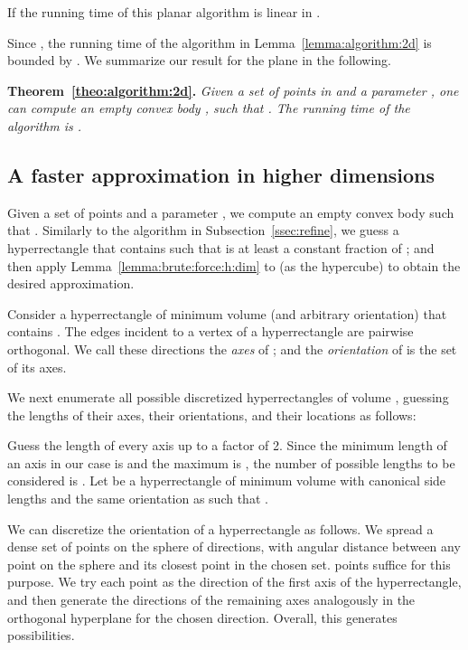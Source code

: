 \documentclass[11pt]{article}
\newcommand{\lemref}[1]{Lemma~\ref{lemma:#1}}
\newcommand{\thmref}[1]{Theorem~\ref{theo:#1}}
\begin{document}
If  the running time of this planar algorithm is linear in .

\medskip
Since , the running time of the algorithm in \lemref{algorithm:2d}
is bounded by .
We summarize our result for the plane in the following.

\medskip
\noindent
{\bf \thmref{algorithm:2d}.} {\em
    Given a set  of  points in  and a
    parameter , one can compute an empty convex body
    , such that . The running time of the algorithm is
    .
}

\subsection{A faster approximation in higher dimensions}
\label{ssec:refine:d}

Given a set  of  points
and a parameter , we compute an empty
convex body  such that
.
Similarly to the algorithm in Subsection~\ref{ssec:refine},
we guess a hyperrectangle  that contains 
such that  is at least a constant fraction
of ; and then apply \lemref{brute:force:h:dim} to 
(as the hypercube) to obtain the desired approximation.

Consider a hyperrectangle  of minimum volume (and arbitrary
orientation) that contains . The  edges incident to a vertex of a
hyperrectangle  are pairwise orthogonal. We call these  directions the
\emph{axes} of ; and the \emph{orientation} of  is the set of its axes.

We next enumerate all possible discretized hyperrectangles of volume ,
guessing the lengths of  their axes, their orientations, and their locations
as follows:

Guess the length of every axis up to a factor of 2. Since the minimum length
of an axis in our case is  and the maximum is ,
the number of possible lengths to be considered is .
Let  be a hyperrectangle of minimum volume with canonical side lengths
and the same orientation as  such that .

We can discretize the orientation of a hyperrectangle as follows.
We spread a dense set of points on the sphere of directions,
with angular distance  between any point on the
sphere and its closest point in the chosen set. 
points suffice for this purpose. We try each point as the
direction of the first axis of the hyperrectangle, and then
generate the directions of the remaining axes analogously
in the orthogonal hyperplane for the chosen direction.
Overall, this generates 
possibilities.
\end{document}
